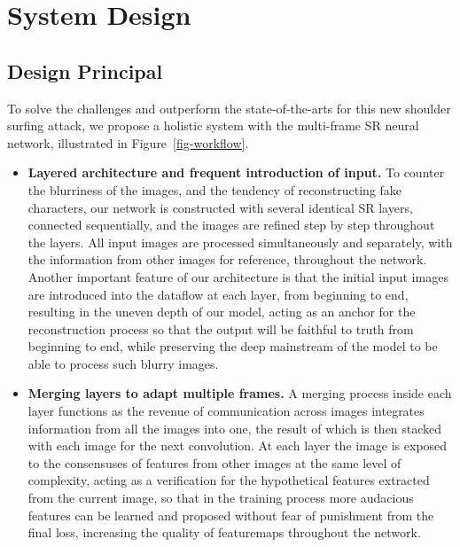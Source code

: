 \section{System Design}
\label{sec-design}

\subsection{Design Principal}
To solve the challenges and outperform the state-of-the-arts for this new shoulder surfing attack, we propose a holistic system with the multi-frame SR neural network, illustrated in Figure~\ref{fig-workflow}.

\begin{itemize}[leftmargin=*]
    \item \textbf{Layered architecture and frequent introduction of input.} To counter the blurriness of the images, and the tendency of reconstructing fake characters, our network is constructed with several identical SR layers, connected sequentially, and the images are refined step by step throughout the layers. All input images are processed simultaneously and separately, with the information from other images for reference, throughout the network. Another important feature of our architecture is that the initial input images are introduced into the dataflow at each layer, from beginning to end, resulting in the uneven depth of our model, acting as an anchor for the reconstruction process so that the output will be faithful to truth from beginning to end, while preserving the deep mainstream of the model to be able to process such blurry images.
    \item \textbf{Merging layers to adapt multiple frames.} A merging process inside each layer functions as the revenue of communication across images integrates information from all the images into one, the result of which is then stacked with each image for the next convolution. At each layer the image is exposed to the consensuses of features from other images at the same level of complexity, acting as a verification for the hypothetical features extracted from the current image, so that in the training process more audacious features can be learned and proposed without fear of punishment from the final loss, increasing the quality of featuremaps throughout the network.

\end{itemize}

